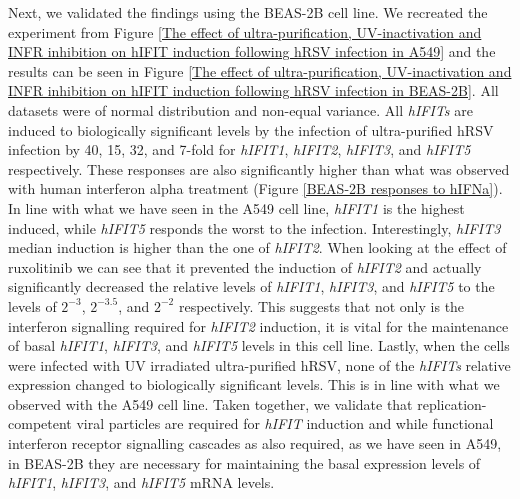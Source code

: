 Next, we validated the findings using the BEAS-2B cell line. We recreated the experiment from Figure \ref{The effect of ultra-purification, UV-inactivation and INFR inhibition on hIFIT induction following hRSV infection in A549} and the results can be seen in Figure \ref{The effect of ultra-purification, UV-inactivation and INFR inhibition on hIFIT induction following hRSV infection in BEAS-2B}. All datasets were of normal distribution and non-equal variance. All \textit{hIFITs} are induced to biologically significant levels by the infection of ultra-purified hRSV infection by 40, 15, 32, and 7-fold for \textit{hIFIT1}, \textit{hIFIT2}, \textit{hIFIT3}, and \textit{hIFIT5} respectively. These responses are also significantly higher than what was observed with human interferon alpha treatment (Figure \ref{BEAS-2B responses to hIFNa}). In line with what we have seen in the A549 cell line, \textit{hIFIT1} is the highest induced, while \textit{hIFIT5} responds the worst to the infection. Interestingly, \textit{hIFIT3} median induction is higher than the one of \textit{hIFIT2}. When looking at the effect of ruxolitinib we can see that it prevented the induction of \textit{hIFIT2} and actually significantly decreased the relative levels of \textit{hIFIT1}, \textit{hIFIT3}, and \textit{hIFIT5} to the levels of \(2^{-3}\), \(2^{-3.5}\), and \(2^{-2}\) respectively. This suggests that not only is the interferon signalling required for \textit{hIFIT2} induction, it is vital for the maintenance of basal \textit{hIFIT1}, \textit{hIFIT3}, and \textit{hIFIT5} levels in this cell line. Lastly, when the cells were infected with UV irradiated ultra-purified hRSV, none of the \textit{hIFITs} relative expression changed to biologically significant levels. This is in line with what we observed with the A549 cell line. Taken together, we validate that replication-competent viral particles are required for \textit{hIFIT} induction and while functional interferon receptor signalling cascades as also required, as we have seen in A549, in BEAS-2B they are necessary for maintaining the basal expression levels of \textit{hIFIT1}, \textit{hIFIT3}, and \textit{hIFIT5} mRNA levels.


